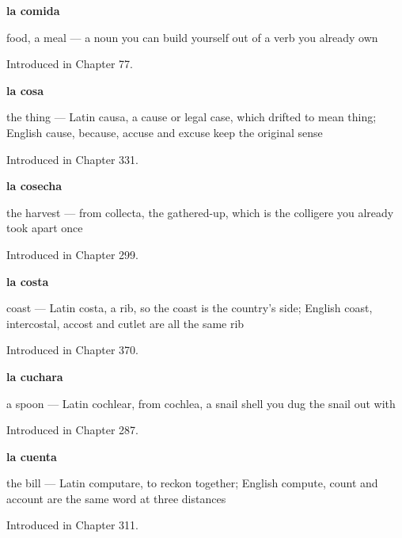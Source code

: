 \noindent\begin{minipage}[t]{\linewidth}
\raggedright
\textbf{la comida}\par
\small food, a meal — a noun you can build yourself out of a verb you already own\par
\footnotesize Introduced in Chapter 77.
\end{minipage}\par\medskip

\noindent\begin{minipage}[t]{\linewidth}
\raggedright
\textbf{la cosa}\par
\small the thing — Latin causa, a cause or legal case, which drifted to mean thing; English cause, because, accuse and excuse keep the original sense\par
\footnotesize Introduced in Chapter 331.
\end{minipage}\par\medskip

\noindent\begin{minipage}[t]{\linewidth}
\raggedright
\textbf{la cosecha}\par
\small the harvest — from collecta, the gathered-up, which is the colligere you already took apart once\par
\footnotesize Introduced in Chapter 299.
\end{minipage}\par\medskip

\noindent\begin{minipage}[t]{\linewidth}
\raggedright
\textbf{la costa}\par
\small coast — Latin costa, a rib, so the coast is the country's side; English coast, intercostal, accost and cutlet are all the same rib\par
\footnotesize Introduced in Chapter 370.
\end{minipage}\par\medskip

\noindent\begin{minipage}[t]{\linewidth}
\raggedright
\textbf{la cuchara}\par
\small a spoon — Latin cochlear, from cochlea, a snail shell you dug the snail out with\par
\footnotesize Introduced in Chapter 287.
\end{minipage}\par\medskip

\noindent\begin{minipage}[t]{\linewidth}
\raggedright
\textbf{la cuenta}\par
\small the bill — Latin computare, to reckon together; English compute, count and account are the same word at three distances\par
\footnotesize Introduced in Chapter 311.
\end{minipage}\par\medskip

